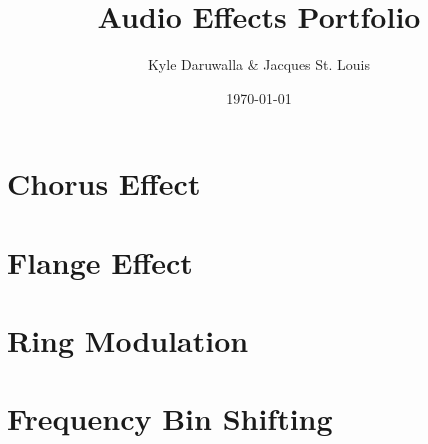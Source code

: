 \documentclass{article}
\title{Audio Effects Portfolio}
\author{Kyle Daruwalla \& Jacques St. Louis}
\date{\today}
\begin{document}
\maketitle

\section{Chorus Effect}


\section{Flange Effect}


\section{Ring Modulation}


\section{Frequency Bin Shifting}

\end{document}
